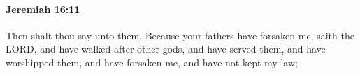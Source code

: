 
		\paragraph{Jeremiah 16:11} %
			\label{JEREMIAH-16-11}

			Then shalt thou say unto them, Because your fathers have forsaken me, saith the LORD, and have walked after other gods, and have served them, and have worshipped them, and have forsaken me, and have not kept my law;


